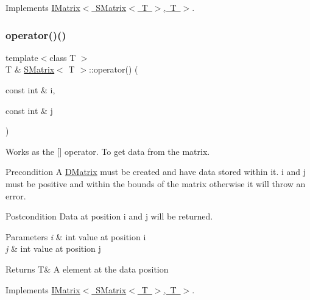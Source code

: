 Implements \mbox{\hyperlink{class_i_matrix_a10121e038635bdf33552c6a1fb288398}{I\+Matrix$<$ S\+Matrix$<$ T $>$, T $>$}}.

\mbox{\label{class_s_matrix_a23038e6371f572bc37c4aec7fe415536}} 
\subsubsection{\texorpdfstring{operator()()}{operator()()}\hspace{0.1cm}{\footnotesize\ttfamily [1/2]}}
{\footnotesize\ttfamily template$<$class T $>$ \\
T \& \mbox{\hyperlink{class_s_matrix}{S\+Matrix}}$<$ T $>$\+::operator() (\begin{DoxyParamCaption}\item[{const int \&}]{i,  }\item[{const int \&}]{j }\end{DoxyParamCaption})\hspace{0.3cm}{\ttfamily [virtual]}}



Works as the \mbox{[}\mbox{]} operator. To get data from the matrix. 

\begin{DoxyPrecond}{Precondition}
A \mbox{\hyperlink{class_d_matrix}{D\+Matrix}} must be created and have data stored within it. i and j must be positive and within the bounds of the matrix otherwise it will throw an error. 
\end{DoxyPrecond}
\begin{DoxyPostcond}{Postcondition}
Data at position i and j will be returned.
\end{DoxyPostcond}

\begin{DoxyParams}{Parameters}
{\em i} & int value at position i \\
\hline
{\em j} & int value at position j \\
\hline
\end{DoxyParams}
\begin{DoxyReturn}{Returns}
T\& A element at the data position 
\end{DoxyReturn}


Implements \mbox{\hyperlink{class_i_matrix_a1e4246d163aaca1b224dec8839645ea9}{I\+Matrix$<$ S\+Matrix$<$ T $>$, T $>$}}.

